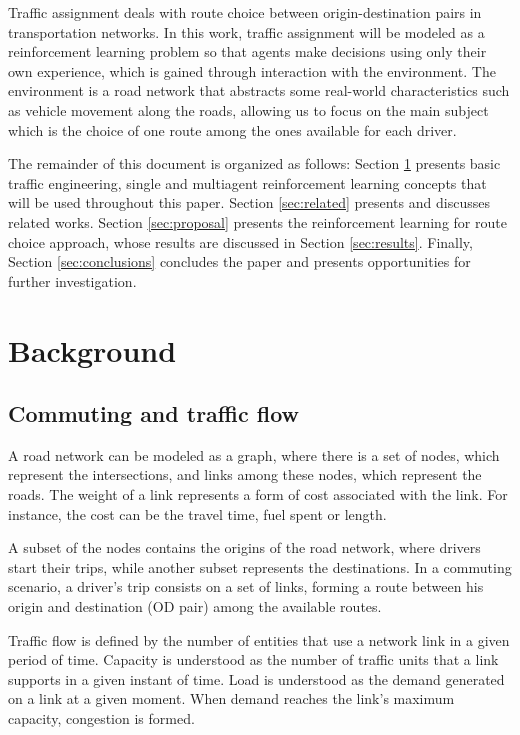 \documentclass{RITA}
\begin{document}
Traffic assignment deals with route choice between origin-destination pairs in transportation networks. In this work, traffic assignment will be modeled as a reinforcement learning problem so that agents make decisions using only their own experience, which is gained through interaction with the environment. The environment is a road network that abstracts some real-world characteristics such as vehicle movement along the roads, allowing us to focus on the main subject which is the choice of one route among the ones available for each driver.

The remainder of this document is organized as follows: Section \ref{sec:concepts} presents basic traffic engineering, single and multiagent reinforcement learning concepts that will be used throughout this paper. Section \ref{sec:related} presents and discusses related works. Section \ref{sec:proposal} presents the reinforcement learning for route choice approach, whose results are discussed in Section \ref{sec:results}. Finally, Section \ref{sec:conclusions} concludes the paper and presents opportunities for further investigation.

\section{Background}
\label{sec:concepts}
\subsection{Commuting and traffic flow}

A road network can be modeled as a graph, where there is a set of nodes, which represent the intersections, and links among these nodes, which represent the roads. The weight of a link represents a form of cost associated with the link. For instance, the cost can be the travel time, fuel spent or length.

A subset of the nodes contains the origins of the road network, where drivers start their trips, while another subset represents the destinations. In a commuting scenario, a driver's trip consists on a set of links, forming a route between his origin and destination (OD pair) among the available routes.

Traffic flow is defined by the number of entities that use a network link in a given period of time. Capacity is understood as the number of traffic units that a link supports in a given instant of time. Load is understood as the demand generated on a link at a given moment. When demand reaches the link's maximum capacity, congestion is formed.
\end{document}
